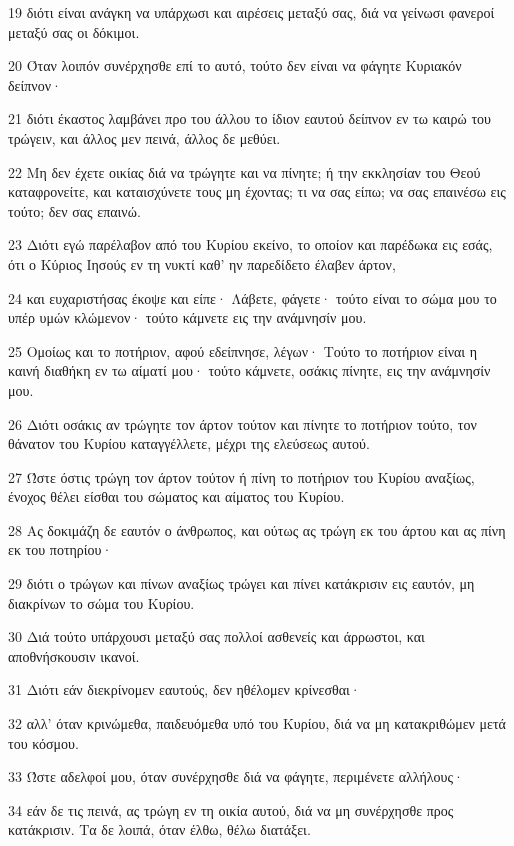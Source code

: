 \par 19 διότι είναι ανάγκη να υπάρχωσι και αιρέσεις μεταξύ σας, διά να γείνωσι φανεροί μεταξύ σας οι δόκιμοι.
\par 20 Όταν λοιπόν συνέρχησθε επί το αυτό, τούτο δεν είναι να φάγητε Κυριακόν δείπνον·
\par 21 διότι έκαστος λαμβάνει προ του άλλου το ίδιον εαυτού δείπνον εν τω καιρώ του τρώγειν, και άλλος μεν πεινά, άλλος δε μεθύει.
\par 22 Μη δεν έχετε οικίας διά να τρώγητε και να πίνητε; ή την εκκλησίαν του Θεού καταφρονείτε, και καταισχύνετε τους μη έχοντας; τι να σας είπω; να σας επαινέσω εις τούτο; δεν σας επαινώ.
\par 23 Διότι εγώ παρέλαβον από του Κυρίου εκείνο, το οποίον και παρέδωκα εις εσάς, ότι ο Κύριος Ιησούς εν τη νυκτί καθ' ην παρεδίδετο έλαβεν άρτον,
\par 24 και ευχαριστήσας έκοψε και είπε· Λάβετε, φάγετε· τούτο είναι το σώμα μου το υπέρ υμών κλώμενον· τούτο κάμνετε εις την ανάμνησίν μου.
\par 25 Ομοίως και το ποτήριον, αφού εδείπνησε, λέγων· Τούτο το ποτήριον είναι η καινή διαθήκη εν τω αίματί μου· τούτο κάμνετε, οσάκις πίνητε, εις την ανάμνησίν μου.
\par 26 Διότι οσάκις αν τρώγητε τον άρτον τούτον και πίνητε το ποτήριον τούτο, τον θάνατον του Κυρίου καταγγέλλετε, μέχρι της ελεύσεως αυτού.
\par 27 Ώστε όστις τρώγη τον άρτον τούτον ή πίνη το ποτήριον του Κυρίου αναξίως, ένοχος θέλει είσθαι του σώματος και αίματος του Κυρίου.
\par 28 Ας δοκιμάζη δε εαυτόν ο άνθρωπος, και ούτως ας τρώγη εκ του άρτου και ας πίνη εκ του ποτηρίου·
\par 29 διότι ο τρώγων και πίνων αναξίως τρώγει και πίνει κατάκρισιν εις εαυτόν, μη διακρίνων το σώμα του Κυρίου.
\par 30 Διά τούτο υπάρχουσι μεταξύ σας πολλοί ασθενείς και άρρωστοι, και αποθνήσκουσιν ικανοί.
\par 31 Διότι εάν διεκρίνομεν εαυτούς, δεν ηθέλομεν κρίνεσθαι·
\par 32 αλλ' όταν κρινώμεθα, παιδευόμεθα υπό του Κυρίου, διά να μη κατακριθώμεν μετά του κόσμου.
\par 33 Ώστε αδελφοί μου, όταν συνέρχησθε διά να φάγητε, περιμένετε αλλήλους·
\par 34 εάν δε τις πεινά, ας τρώγη εν τη οικία αυτού, διά να μη συνέρχησθε προς κατάκρισιν. Τα δε λοιπά, όταν έλθω, θέλω διατάξει.

